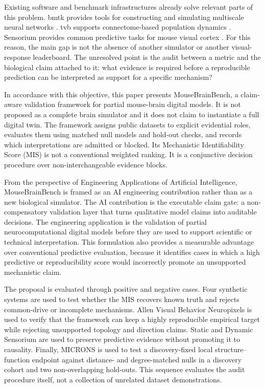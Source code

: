 \documentclass[a4paper,fleqn]{cas-sc}
\begin{document}
Existing software and benchmark infrastructures already solve relevant parts of
this problem. \ac{bmtk} provides tools for constructing and simulating multiscale
neural networks \citep{dai2020bmtk}. \ac{tvb} supports connectome-based
population dynamics \citep{tvb2013}. Sensorium provides common predictive tasks
for mouse visual cortex \citep{willeke2022sensorium,turishcheva2023dynamic}.
For this reason, the main gap is not the absence of another simulator or another
visual-response leaderboard. The unresolved point is the audit between a metric
and the biological claim attached to it: what evidence is required before a
reproducible prediction can be interpreted as support for a specific mechanism?

In accordance with this objective, this paper presents MouseBrainBench, a
claim-aware validation framework for partial mouse-brain digital models. It is
not proposed as a complete brain simulator and it does not claim to instantiate
a full digital twin. The framework assigns public datasets to explicit
evidential roles, evaluates them using matched null models and hold-out checks,
and records which interpretations are admitted or blocked. Its Mechanistic
Identifiability Score (MIS) is not a conventional weighted ranking. It is a
conjunctive decision procedure over non-interchangeable evidence blocks.

From the perspective of Engineering Applications of Artificial Intelligence, MouseBrainBench is framed as an AI engineering contribution rather than as a new biological simulator. The AI contribution is the executable claim gate: a non-compensatory validation layer that turns qualitative model claims into auditable decisions. The engineering application is the validation of partial neurocomputational digital models before they are used to support scientific or technical interpretation. This formulation also provides a measurable advantage over conventional predictive evaluation, because it identifies cases in which a high predictive or reproducibility score would incorrectly promote an unsupported mechanistic claim.

The proposal is evaluated through positive and negative cases. Four synthetic
systems are used to test whether the MIS recovers known truth and rejects
common-drive or incomplete mechanisms. Allen Visual Behavior Neuropixels is used
to verify that the framework can keep a highly reproducible empirical target
while rejecting unsupported topology and direction claims. Static and Dynamic
Sensorium are used to preserve predictive evidence without promoting it to
causality. Finally, MICRONS is used to test a discovery-fixed local
structure--function endpoint against distance- and degree-matched nulls in a
discovery cohort and two non-overlapping hold-outs. This sequence evaluates the
audit procedure itself, not a collection of unrelated dataset demonstrations.
\end{document}

